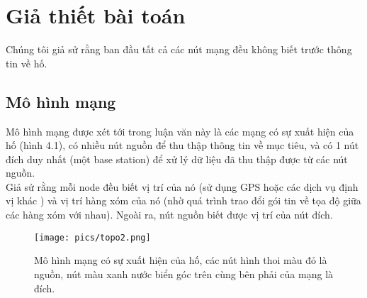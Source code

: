 \documentclass[12pt]{report}
\begin{document}
\section{Giả thiết bài toán}
\label{sec:4.1}
Chúng tôi giả sử rằng ban đầu tất cả các nút mạng đều không biết trước thông tin về hố.
\subsection{Mô hình mạng}
\label{sec:4.1.1}
Mô hình mạng được xét tới trong luận văn này là các mạng có sự xuất hiện của hố (hình 4.1), có nhiều nút nguồn để thu thập thông tin về mục tiêu, và có 1 nút đích duy nhất (một base station) để xử lý dữ liệu đã thu thập được từ các nút nguồn.\\
Giả sử rằng mỗi node đều biết vị trí của nó (sử dụng GPS hoặc các dịch vụ định vị khác \cite{gps}) và vị trí hàng xóm của nó (nhờ quá trình trao đổi gói tin về tọa độ giữa các hàng xóm với nhau). Ngoài ra, nút nguồn biết được vị trí của nút đích.
\begin{figure}[H]
\centering
\texttt{[image: pics/topo2.png]} 
\caption[Mô hình mạng]{Mô hình mạng có sự xuất hiện của hố, các nút hình thoi màu đỏ là nguồn, nút màu xanh nước biển góc trên cùng bên phải của mạng là đích.}
\end{figure}
\end{document}
